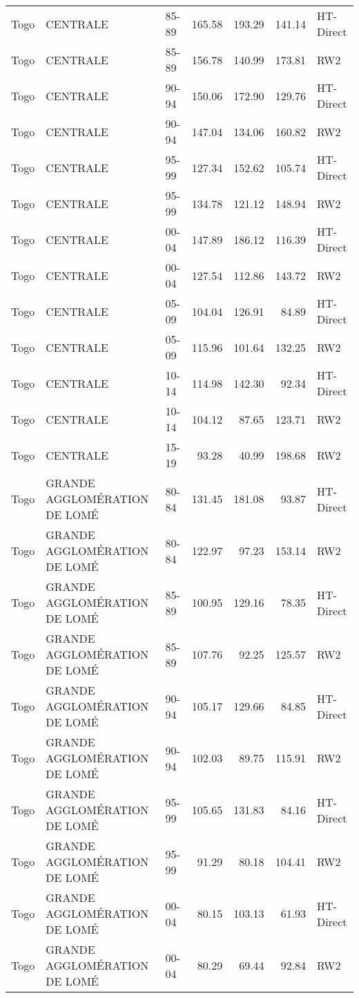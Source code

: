 \begin{longtable}{lllrrrl}
  Togo & CENTRALE & 85-89 & 165.58 & 193.29 & 141.14 & HT-Direct \\ 
  Togo & CENTRALE & 85-89 & 156.78 & 140.99 & 173.81 & RW2 \\ 
  Togo & CENTRALE & 90-94 & 150.06 & 172.90 & 129.76 & HT-Direct \\ 
  Togo & CENTRALE & 90-94 & 147.04 & 134.06 & 160.82 & RW2 \\ 
  Togo & CENTRALE & 95-99 & 127.34 & 152.62 & 105.74 & HT-Direct \\ 
  Togo & CENTRALE & 95-99 & 134.78 & 121.12 & 148.94 & RW2 \\ 
  Togo & CENTRALE & 00-04 & 147.89 & 186.12 & 116.39 & HT-Direct \\ 
  Togo & CENTRALE & 00-04 & 127.54 & 112.86 & 143.72 & RW2 \\ 
  Togo & CENTRALE & 05-09 & 104.04 & 126.91 & 84.89 & HT-Direct \\ 
  Togo & CENTRALE & 05-09 & 115.96 & 101.64 & 132.25 & RW2 \\ 
  Togo & CENTRALE & 10-14 & 114.98 & 142.30 & 92.34 & HT-Direct \\ 
  Togo & CENTRALE & 10-14 & 104.12 & 87.65 & 123.71 & RW2 \\ 
  Togo & CENTRALE & 15-19 & 93.28 & 40.99 & 198.68 & RW2 \\ 
  Togo & GRANDE AGGLOMÉRATION DE LOMÉ & 80-84 & 131.45 & 181.08 & 93.87 & HT-Direct \\ 
  Togo & GRANDE AGGLOMÉRATION DE LOMÉ & 80-84 & 122.97 & 97.23 & 153.14 & RW2 \\ 
  Togo & GRANDE AGGLOMÉRATION DE LOMÉ & 85-89 & 100.95 & 129.16 & 78.35 & HT-Direct \\ 
  Togo & GRANDE AGGLOMÉRATION DE LOMÉ & 85-89 & 107.76 & 92.25 & 125.57 & RW2 \\ 
  Togo & GRANDE AGGLOMÉRATION DE LOMÉ & 90-94 & 105.17 & 129.66 & 84.85 & HT-Direct \\ 
  Togo & GRANDE AGGLOMÉRATION DE LOMÉ & 90-94 & 102.03 & 89.75 & 115.91 & RW2 \\ 
  Togo & GRANDE AGGLOMÉRATION DE LOMÉ & 95-99 & 105.65 & 131.83 & 84.16 & HT-Direct \\ 
  Togo & GRANDE AGGLOMÉRATION DE LOMÉ & 95-99 & 91.29 & 80.18 & 104.41 & RW2 \\ 
  Togo & GRANDE AGGLOMÉRATION DE LOMÉ & 00-04 & 80.15 & 103.13 & 61.93 & HT-Direct \\ 
  Togo & GRANDE AGGLOMÉRATION DE LOMÉ & 00-04 & 80.29 & 69.44 & 92.84 & RW2 \\ 

\end{longtable}
